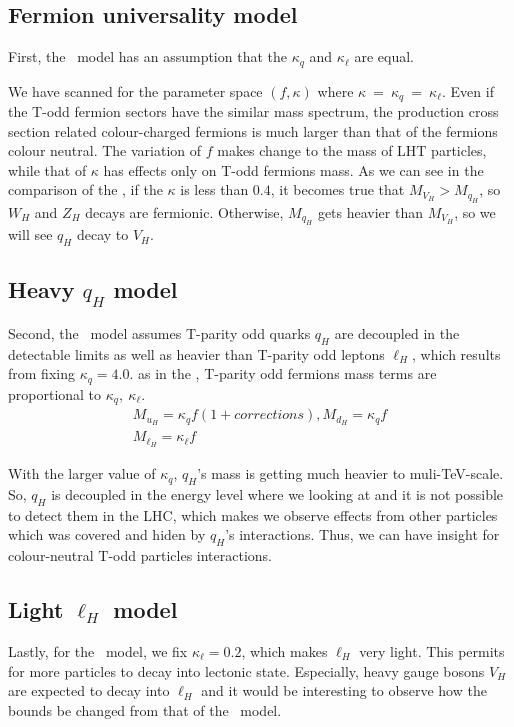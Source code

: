 \subsection{Fermion universality model}
First, the \fu~model has an assumption that the $\kappa_q$ and $\kappa_\ell$ are equal. 

We have scanned for the parameter space $(f,\kappa)$ where $\kappa~=~\kappa_q~=~\kappa_\ell$. 
Even if the T-odd fermion sectors have the similar mass spectrum, 
the production cross section related colour-charged fermions is much larger than that of the fermions colour neutral. 
The variation of $f$ makes change to the mass of LHT particles, while that of $\kappa$ has effects only on T-odd fermions mass. 
As we can see in the comparison of the , if the $\kappa$ is less than $0.4$, 
it becomes true that $M_{V_H} > M_{q_H}$, so $W_H$ and $Z_H$ decays are fermionic. 
Otherwise, $M_{q_H}$ gets heavier than $M_{V_H}$, so we will see $q_H$ decay to $V_H$. 


\subsection{Heavy $q_H$ model}
Second, the \hq~model assumes T-parity odd quarks $q_H$ are decoupled in the detectable limits as well as heavier than T-parity odd leptons $\ell_H$,
which results from fixing $\kappa_q = 4.0 $. 
as in the , T-parity odd fermions mass terms are proportional to $\kappa_q,~ \kappa_\ell$. 
\begin{align}
 M_{u_H}=\kappa_q f (1+corrections) , M_{d_H}= \kappa_q f \nonumber \\
 M_{\ell_H} = \kappa_\ell f 
\end{align}

With the larger value of $\kappa_q$, $q_H$'s mass is getting much heavier to muli-TeV-scale.
So, $q_H$ is decoupled in the energy level where we looking at and 
it is not possible to detect them in the LHC, which makes we observe effects from other particles which was covered and hiden by $q_H$'s interactions. 
Thus, we can have insight for colour-neutral T-odd particles interactions.

\subsection{Light $\ell_H$ model}
Lastly, for the \lil~model, we fix $\kappa_\ell = 0.2$, which makes $\ell_H$ very light. 
This permits for more particles to decay into lectonic state. 
Especially, heavy gauge bosons $V_H$ are expected to decay into $\ell_H$ and 
it would be interesting to observe how the bounds be changed from that of the \fu~model.


